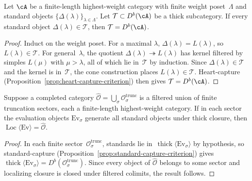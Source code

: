 \begin{proposition}
\label{prop:standard-capture-criterion}
Let $\cA$ be a finite-length highest-weight category with finite
weight poset~$\Lambda$ and standard objects
$\{\Delta(\lambda)\}_{\lambda \in \Lambda}$.
Let $\mathcal{T} \subset D^b(\cA)$ be a thick subcategory.
If every standard object $\Delta(\lambda) \in \mathcal{T}$, then
$\mathcal{T} = D^b(\cA)$.
\end{proposition}
\begin{proof}
Induct on the weight poset. For a maximal $\lambda$,
$\Delta(\lambda) = L(\lambda)$, so $L(\lambda) \in \mathcal{T}$.
For general~$\lambda$, the quotient
$\Delta(\lambda) \twoheadrightarrow L(\lambda)$ has kernel
filtered by simples $L(\mu)$ with $\mu > \lambda$, all of which
lie in~$\mathcal{T}$ by induction.
Since $\Delta(\lambda) \in \mathcal{T}$ and the kernel is in~$\mathcal{T}$,
the cone construction places $L(\lambda) \in \mathcal{T}$.
Heart-capture
(Proposition~\ref{prop:heart-capture-criterion}) then gives
$\mathcal{T} = D^b(\cA)$.
\end{proof}

\begin{corollary}
\label{cor:sectorwise-localizing-generation}
Suppose a completed category
$\widehat{\mathcal{O}} = \bigcup_\sigma \mathcal{O}_\sigma^{\mathrm{trunc}}$
is a filtered union of finite truncation sectors, each a
finite-length highest-weight category. If in each sector the
evaluation objects $\mathrm{Ev}_\sigma$ generate all standard objects
under thick closure, then
$\operatorname{Loc}\langle \mathrm{Ev} \rangle = \widehat{\mathcal{O}}$.
\end{corollary}
\begin{proof}
In each finite sector~$\mathcal{O}_\sigma^{\mathrm{trunc}}$,
standards lie in~$\operatorname{thick}\langle \mathrm{Ev}_\sigma \rangle$
by hypothesis, so standard-capture
(Proposition~\ref{prop:standard-capture-criterion}) gives
$\operatorname{thick}\langle \mathrm{Ev}_\sigma \rangle =
D^b(\mathcal{O}_\sigma^{\mathrm{trunc}})$.
Since every object of $\widehat{\mathcal{O}}$ belongs to some sector
and localizing closure is closed under filtered colimits, the result
follows.
\end{proof}

